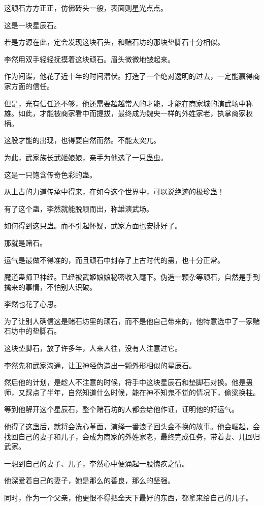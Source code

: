 \begin{this_body}
这顽石方方正正，仿佛砖头一般，表面则星光点点。

这是一块星辰石。

若是方源在此，定会发现这块石头，和赌石坊的那块垫脚石十分相似。

李然用双手轻轻抚摸着这块顽石。眉头微微地皱起来。

作为间谍，他花了近十年的时间潜伏。打造了一个绝对透明的过去，一定能赢得商家方面的信任。

但是，光有信任还不够，他还需要超越常人的才能，才能在商家城的演武场中称雄。如此，才能被商家看中而提拔，最终成为魏央一样的外姓家老，执掌商家权柄。

这股才能的出现，也得要自然而然。不能太突兀。

为此，武家族长武姬娘娘，亲手为他选了一只蛊虫。

这是一只饱含传奇色彩的蛊。

从上古的力道传承中得来，在如今这个世界中，可以说绝迹的极珍蛊！

有了这个蛊，李然就能脱颖而出，称雄演武场。

如何得到这只蛊。而不引起怀疑，武家方面也安排好了。

那就是赌石。

运气是最做不得准的，而且顽石中封存了上古时代的蛊，也十分正常。

魔道蛊师卫神经。已经被武姬娘娘秘密收入麾下。伪造一颗杂等顽石，自然是手到擒来的事情，不怕别人识破。

李然也花了心思。

为了让别人确信这是赌石坊里的顽石，而不是他自己带来的，他特意选中了一家赌石坊中的垫脚石。

这块垫脚石，放了许多年，人来人往，没有人注意过它。

李然先和武家沟通，让卫神经伪造出一颗外形相似的星辰石。

然后他的计划，是趁人不注意的时候，将手中这块星辰石和垫脚石对换。他是蛊师，又踩点了半年，自然知道什么时候，能在神不知鬼不觉的情况下，偷梁换柱。

等到他解开这个星辰石，整个赌石坊的人都会给他作证，证明他的好运气。

他得了这蛊后，就将会洗心革面，演绎一番浪子回头金不换的故事。他会崛起，会找回自己的妻子和儿子，会成为商家的外姓家老，最终完成任务，带着妻、儿回归武家。

一想到自己的妻子、儿子，李然心中便涌起一股愧疚之情。

他深爱着自己的妻子，她是那么的善良，那么的坚强。

同时，作为一个父亲，他更恨不得把全天下最好的东西，都拿来给自己的儿子。


\end{this_body}
